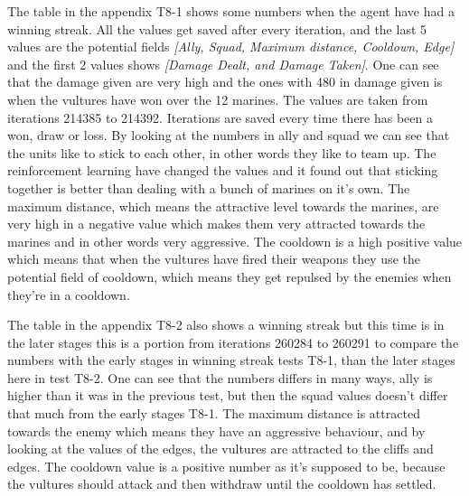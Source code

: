 

The table in the appendix T8-1 shows some numbers when the agent have had a winning streak. All the values get saved after every iteration, and the last 5 values are the potential fields \textit{[Ally, Squad, Maximum distance, Cooldown, Edge]} and the first 2 values shows \textit{[Damage Dealt, and Damage Taken]}. One can see that the damage given are very high and the ones with 480 in damage given is when the vultures have won over the 12 marines. The values are taken from iterations 214385 to 214392. Iterations are saved every time there has been a won, draw or loss. By looking at the numbers in ally and squad we can see that the units like to stick to each other, in other words they like to team up. The reinforcement learning have changed the values and it found out that sticking together is better than dealing with a bunch of marines on it's own. The maximum distance, which means the attractive level towards the marines, are very high in a negative value which makes them very attracted towards the marines and in other words very aggressive. The cooldown is a high positive value which means that when the vultures have fired their weapons they use the potential field of cooldown, which means they get repulsed by the enemies when they're in a cooldown. 






The table in the appendix T8-2 also shows a winning streak but this time is in the later stages this is a portion from iterations 260284 to 260291 to compare the numbers with the early stages in winning streak tests T8-1, than the later stages here in test T8-2. One can see that the numbers differs in many ways, ally is higher than it was in the previous test, but then the squad values doesn't differ that much from the early stages T8-1. The maximum distance is attracted towards the enemy which means they have an aggressive behaviour, and by looking at the values of the edges, the vultures are attracted to the cliffs and edges. The cooldown value is a positive number as it's supposed to be, because the vultures should attack and then withdraw until the cooldown has settled.

